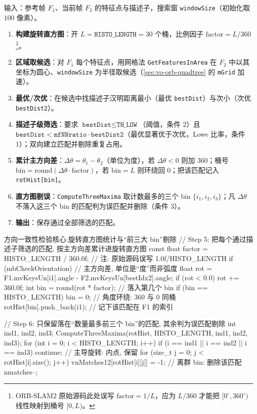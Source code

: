 \begin{algo}\label{alg:vo-rothist}
输入：参考帧 $F_1$、当前帧 $F_2$ 的特征点与描述子，搜索窗 \texttt{windowSize}（初始化取 $100$ 像素）。
\begin{enumerate}
  \item \textbf{构建旋转直方图}：开 $L=\texttt{HISTO\_LENGTH}=30$ 个桶，比例因子 $\mathrm{factor}=L/360$\footnote{ORB-SLAM2 原始源码此处误写 $\mathrm{factor}=1/L$，应为 $L/360$ 才能把 $[0^\circ,360^\circ)$ 线性映射到桶号 $[0,L)$。}。
  \item \textbf{区域取候选}：对 $F_1$ 每个特征点，用网格法 \texttt{GetFeaturesInArea} 在 $F_2$ 中以其坐标为圆心、\texttt{windowSize} 为半径取候选（\cref{sec:vo-orb-quadtree} 的 \texttt{mGrid} 加速）。
  \item \textbf{最优/次优}：在候选中找描述子汉明距离最小（最优 \texttt{bestDist}）与次小（次优 \texttt{bestDist2}）。
  \item \textbf{描述子级筛选}：要求 $\texttt{bestDist}\le\texttt{TH\_LOW}$（阈值，条件 2）且 $\texttt{bestDist}<\texttt{mfNNratio}\cdot\texttt{bestDist2}$（最优显著优于次优，Lowe 比率，条件 1）；双向建立匹配并剔除重复占用。
  \item \textbf{累计主方向差}：$\Delta\theta=\theta_1-\theta_2$（单位为度），若 $\Delta\theta<0$ 则加 $360$；桶号 $\mathrm{bin}=\mathrm{round}(\Delta\theta\cdot\mathrm{factor})$，若 $\mathrm{bin}=L$ 则环绕回 $0$；把该匹配记入 \texttt{rotHist[bin]}。
  \item \textbf{直方图剔误}：\texttt{ComputeThreeMaxima} 取计数最多的三个 bin $\{i_1,i_2,i_3\}$；凡 $\Delta\theta$ 不落入这三个 bin 的匹配判为误匹配并删除（条件 3）。
  \item \textbf{输出}：保存通过全部筛选的匹配。
\end{enumerate}
\end{algo}

\begin{codebox}[C++]{方向一致性检验核心:旋转直方图统计与“前三大 bin”剔除}
// Step 5: 把每个通过描述子筛选的匹配, 按主方向差累计进旋转直方图
const float factor = HISTO_LENGTH / 360.0f;  // 注: 原始源码误写 1.0f/HISTO_LENGTH
if (mbCheckOrientation) {
    // 主方向差, 单位是“度”而非弧度
    float rot = F1.mvKeysUn[i1].angle - F2.mvKeysUn[bestIdx2].angle;
    if (rot < 0.0) rot += 360.0f;
    int bin = round(rot * factor);           // 落入第几个 bin
    if (bin == HISTO_LENGTH) bin = 0;        // 角度环绕: 360 与 0 同桶
    rotHist[bin].push_back(i1);              // 记下该匹配在 F1 的索引
}

// Step 6: 只保留落在“数量最多前三个 bin”的匹配, 其余判为误匹配剔除
int ind1, ind2, ind3;
ComputeThreeMaxima(rotHist, HISTO_LENGTH, ind1, ind2, ind3);
for (int i = 0; i < HISTO_LENGTH; i++) {
    if (i == ind1 || i == ind2 || i == ind3) continue; // 主导旋转: 内点, 保留
    for (size_t j = 0; j < rotHist[i].size(); j++) {
        vnMatches12[rotHist[i][j]] = -1;     // 离群 bin: 删除该匹配
        nmatches--;
    }
}
\end{codebox}

